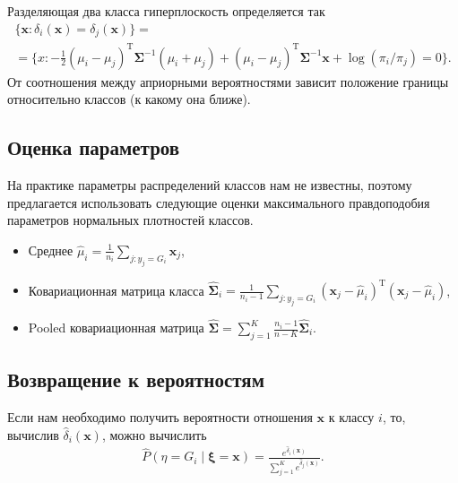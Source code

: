 \documentclass{article}
\begin{document}
Разделяющая два класса гиперплоскость определяется так
\begin{multline*}
  \{\mathbf{x} : \delta_i(\mathbf{x}) = \delta_j(\mathbf{x})\} =\\ = \{x : -\frac{1}{2} (\mu_i - \mu_j)^\mathrm{T} \mathbf{\Sigma}^{-1}(\mu_i + \mu_j) + (\mu_i - \mu_j)^\mathrm{T} \mathbf{\Sigma}^{-1}\mathbf{x} + \log(\pi_i/\pi_j) = 0\}.
\end{multline*}
От соотношения между априорными вероятностями зависит положение границы относительно классов (к какому она ближе).


\subsection{Оценка параметров}
На практике параметры распределений классов нам не известны, поэтому предлагается использовать следующие оценки максимального правдоподобия параметров нормальных плотностей классов.
\begin{itemize}
  \item Среднее
  $\widehat{\mu}_i = \frac{1}{n_i}\sum\limits_{j: y_j = G_i} \mathbf{x}_j$,
  \item Ковариационная матрица класса $\widehat{\mathbf{\Sigma}}_i = \frac{1}{n_i - 1}\sum\limits_{j: y_j = G_i} (\mathbf{x}_j - \widehat{\mu}_i)^\mathrm{T}(\mathbf{x}_j - \widehat{\mu}_i)$,
  \item Pooled ковариационная матрица $\widehat{\mathbf{\Sigma}}= \sum\limits_{j = 1}^K\frac{n_i - 1}{n - K} \widehat{\mathbf{\Sigma}}_i$.
\end{itemize}

\subsection{Возвращение к вероятностям}
Если нам необходимо получить вероятности отношения $\mathbf{x}$ к классу $i$, то, вычислив $\widehat{\delta}_i(\mathbf{x})$, можно вычислить
\begin{align*}
  \widehat{P}(\eta = G_i \mid \boldsymbol{\xi} = \mathbf{x}) = \frac{e^{\widehat{\delta}_i(\mathbf{x})}}{\sum\limits_{j = 1}^K e^{\widehat{\delta}_j(\mathbf{x})}}.
\end{align*}
\end{document}
